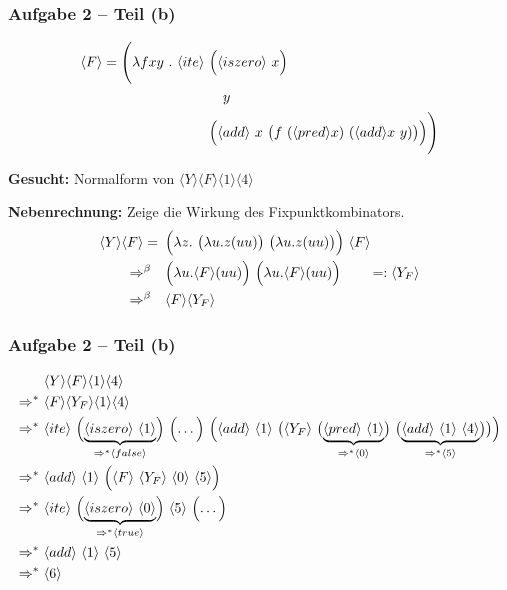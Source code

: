 \documentclass{beamer}
\newcommand{\num}[1]{\ensuremath{\langle #1 \rangle}}
\begin{document}
\begin{frame} \frametitle{Aufgabe 2 -- Teil (b)}
	\small
	\begin{align*}
		\num{F} = \Biggl( \lambda f xy \ . \ \num{ite} \ &\Bigl(\num{iszero} \ x \Bigr) \\ & \quad y  \\
		&\Bigl( \num{add} \ x \ \big( f \ (\num{pred} x) \ (\num{add} x \ y) \big) \Bigr) \Biggr)
	\end{align*}

	\textbf{Gesucht:} Normalform von $\num{Y} \num{F} \num{1} \num{4}$
	
	\bigskip \pause
	
	\textbf{Nebenrechnung:} Zeige die Wirkung des Fixpunktkombinators.
	\begin{align*}
		\num{Y} \num{F}
		= \enskip &\Bigl( \lambda z . \ \bigl( \lambda u . z (uu) \bigr) \ \bigl( \lambda u. z (uu) \bigr) \Bigr) \ \num{F} \\
		\Rightarrow^{\beta} \quad &\Bigl( \lambda u . \num{F} (uu) \Bigr) \ \Bigl( \lambda u. \num{F} (uu) \Bigr) \qquad =: \num{Y_F} \\
		\Rightarrow^{\beta} \quad &\num{F} \num{Y_F}
	\end{align*}
\end{frame}

\begin{frame} \frametitle{Aufgabe 2 -- Teil (b)}
	\footnotesize
	\begin{align*}
		&\num{Y} \num{F} \num{1} \num{4} \\
		\Rightarrow^\ast \ &\num{F} \num{Y_F} \num{1} \num{4} \\
		\Rightarrow^\ast \
		&\num{ite} \ 
		\Bigl( \underbrace{\num{iszero} \ \num{1}}_{\Rightarrow^\ast \num{false}} \Bigr) \ \Bigl( \dots \Bigr) \ \Bigl( \num{add} \ \num{1} \ \bigl( \num{Y_F} \ \bigl(\underbrace{\num{pred} \ \num{1}}_{\Rightarrow^\ast \num{0}} \bigr) \ \bigl(\underbrace{\num{add} \ \num{1} \ \num{4}}_{\Rightarrow^\ast \num{5}} \bigr) \bigr) \Bigr) \\
		\Rightarrow^\ast \
		&\num{add} \ \num{1} \ \Bigl( \num{F} \ \num{Y_F} \ \num{0} \ \num{5} \Bigr) \\
		\Rightarrow^\ast \
		&\num{ite} \ 
		\Bigl( \underbrace{\num{iszero} \ \num{0}}_{\Rightarrow^\ast \num{true}} \Bigr) \  \num{5}  \ \Bigl( \dots \Bigr) \\
		\Rightarrow^\ast \ &\num{add} \ \num{1} \ \num{5} \\
		\Rightarrow^\ast \ &\num{6}
	\end{align*} 
\end{frame}
\end{document}
